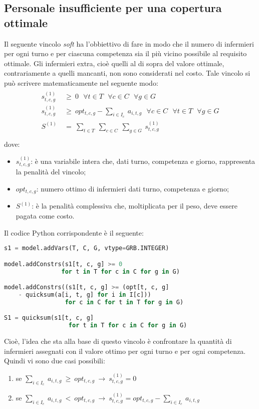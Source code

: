 \subsection{Personale insufficiente per una copertura ottimale}
Il seguente vincolo \textit{soft} ha l'obbiettivo di fare in modo che il numero di infermieri per ogni turno e per ciascuna competenza sia il più vicino possibile al requisito ottimale. 
Gli infermieri extra, cioè quelli al di sopra del valore ottimale, contrariamente a quelli mancanti, non sono considerati nel costo.
Tale vincolo si può scrivere matematicamente nel seguente modo:
\begin{gather}
\begin{aligned}
s^{(1)}_{t, c, g} ~ &\geq ~ 0 ~~~ \forall t \in T ~~~ \forall c \in C ~~~ \forall g \in G \\
s^{(1)}_{t, c, g} ~ &\geq ~ opt_{t,c,g} - \sum_{i \in I_c} ~ a_{i, t, g} ~~~ \forall c \in C ~~~ \forall t \in T ~~~ \forall g \in G \\
S^{(1)} ~ &= ~ \sum_{t \in T} ~ \sum_{c \in C} ~ \sum_{g \in G} ~ s^{(1)}_{t, c, g} \\
\end{aligned}
\end{gather}
dove:
\begin{itemize}
\item $s^{(1)}_{t, c, g}$: è una variabile intera che, dati turno, competenza e giorno, rappresenta la penalità del vincolo;
\item $opt_{t,c,g}$: numero ottimo di infermieri dati turno, competenza e giorno;
\item $S^{(1)}$: è la penalità complessiva che, moltiplicata per il peso, deve essere pagata come costo.
\end{itemize}

Il codice Python corrispondente è il seguente:
\begin{lstlisting}[language=Python]
s1 = model.addVars(T, C, G, vtype=GRB.INTEGER)

model.addConstrs(s1[t, c, g] >= 0 
				for t in T for c in C for g in G)

model.addConstrs((s1[t, c, g] >= (opt[t, c, g] 
	- quicksum(a[i, t, g] for i in I[c])) 
   				 for c in C for t in T for g in G)

S1 = quicksum(s1[t, c, g] 
				  for t in T for c in C for g in G)
\end{lstlisting}

Cioè, l'idea che sta alla base di questo vincolo è confrontare la quantità di infermieri assegnati con il valore ottimo per ogni turno e per ogni competenza.
Quindi vi sono due casi possibili:
\begin{enumerate}
\item se $\sum_{i \in I_c} ~ a_{i, t, g} ~ \geq ~ opt_{t,c,g} ~ \longrightarrow ~ s^{(1)}_{t, c, g} = 0$
\item se $\sum_{i \in I_c} ~ a_{i, t, g} ~ < ~ opt_{t,c,g} ~ \longrightarrow ~ s^{(1)}_{t, c, g} = opt_{t,c,g} - \sum_{i \in I_c} ~ a_{i, t, g}$
\end{enumerate}

